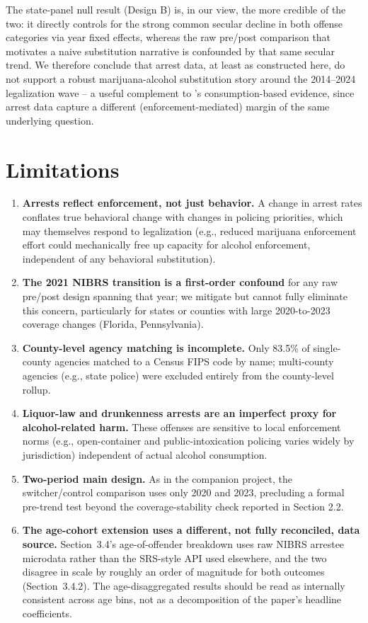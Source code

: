 \documentclass[11pt]{article}
\begin{document}
The state-panel null result (Design B) is, in our view, the more
credible of the two: it directly controls for the strong common
secular decline in both offense categories via year fixed effects,
whereas the raw pre/post comparison that motivates a naive
substitution narrative is confounded by that same secular trend. We
therefore conclude that arrest data, at least as constructed here, do
not support a robust marijuana-alcohol substitution story around the
2014--2024 legalization wave -- a useful complement to
\citet{AndersonHansenRees2013}'s consumption-based evidence, since
arrest data capture a different (enforcement-mediated) margin of the
same underlying question.

\section{Limitations}

\begin{enumerate}[label=(\arabic*), leftmargin=*]
\item \textbf{Arrests reflect enforcement, not just behavior.} A
change in arrest rates conflates true behavioral change with changes
in policing priorities, which may themselves respond to legalization
(e.g., reduced marijuana enforcement effort could mechanically free up
capacity for alcohol enforcement, independent of any behavioral
substitution).
\item \textbf{The 2021 NIBRS transition is a first-order confound}
for any raw pre/post design spanning that year; we mitigate but cannot
fully eliminate this concern, particularly for states or counties with
large 2020-to-2023 coverage changes (Florida, Pennsylvania).
\item \textbf{County-level agency matching is incomplete.} Only 83.5\%
of single-county agencies matched to a Census FIPS code by name;
multi-county agencies (e.g., state police) were excluded entirely from
the county-level rollup.
\item \textbf{Liquor-law and drunkenness arrests are an imperfect proxy
for alcohol-related harm.} These offenses are sensitive to local
enforcement norms (e.g., open-container and public-intoxication
policing varies widely by jurisdiction) independent of actual alcohol
consumption.
\item \textbf{Two-period main design.} As in the companion project,
the switcher/control comparison uses only 2020 and 2023, precluding a
formal pre-trend test beyond the coverage-stability check reported in
Section 2.2.
\item \textbf{The age-cohort extension uses a different, not fully
reconciled, data source.} Section~3.4's age-of-offender breakdown uses
raw NIBRS arrestee microdata rather than the SRS-style API used
elsewhere, and the two disagree in scale by roughly an order of
magnitude for both outcomes (Section~3.4.2). The age-disaggregated
results should be read as internally consistent across age bins, not
as a decomposition of the paper's headline coefficients.
\end{enumerate}
\end{document}
